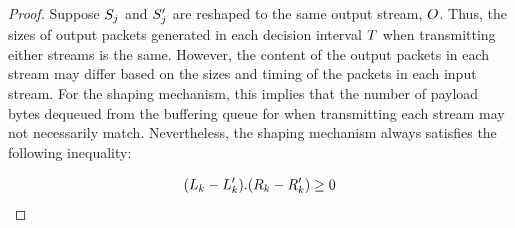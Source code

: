 \begin{proof}
    Suppose $S_{j}$ and $S_{j}'$ are reshaped to the same output stream,
    $O$. Thus, the sizes of output packets generated in each decision
    interval $T$ when transmitting either streams is the same. However, the
    content of the output packets in each stream may differ based on the sizes and
    timing of the packets in each input stream.
    For the shaping mechanism, this implies that the number of payload bytes
    dequeued from the buffering queue for when transmitting each stream may not
    necessarily match.
    Nevertheless, the shaping mechanism always satisfies the following inequality:
    
    \begin{equation}\label{equ:queue-dequeue}
            (L_{k} - L_{k}').({R}_{k} - {R}_{k}') \geq 0
    \end{equation}
    

\end{proof}
